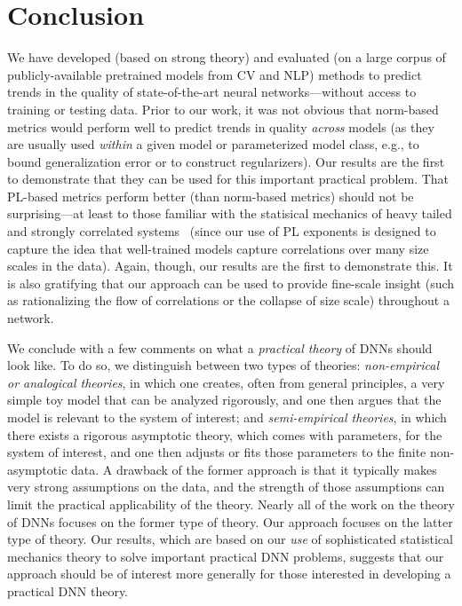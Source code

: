 \section{Conclusion}
\label{sxn:conc}

We have developed (based on strong theory) and evaluated (on a large corpus of publicly-available pretrained models from CV and NLP) methods to predict trends in the quality of state-of-the-art neural networks---without access to training or testing data.
Prior to our work, it was not obvious that norm-based metrics would perform well to predict trends in quality \emph{across} models (as they are usually used \emph{within} a given model or parameterized model class, e.g., to bound generalization error or to construct regularizers).
Our results are the first to demonstrate that they can be used for this important practical problem.
That PL-based metrics perform better (than norm-based metrics) should not be surprising---at least to those familiar with the statisical mechanics of heavy tailed and strongly correlated systems~\cite{BouchaudPotters03, SornetteBook, BP11, bun2017} (since our use of PL exponents is designed to capture the idea that well-trained models capture correlations over many size scales in the data).
Again, though, our results are the first to demonstrate this.
It is also gratifying that our approach can be used to provide fine-scale insight (such as rationalizing the flow of correlations or the collapse of size scale) throughout a network. 

We conclude with a few comments on what a \emph{practical theory} of DNNs should look like.
To do so, we distinguish between two types of theories:
\emph{non-empirical or analogical theories}, in which one creates, often from general principles, a very simple toy model that can be analyzed rigorously, and one then argues that the model is relevant to the system of interest; and 
\emph{semi-empirical theories}, in which there exists a rigorous asymptotic theory, which comes with parameters, for the system of interest, and one then adjusts or fits those parameters to the finite non-asymptotic data.
A drawback of the former approach is that it typically makes very strong assumptions on the data, and the strength of those assumptions can limit the practical applicability of the theory.
Nearly all of the work on the theory of DNNs focuses on the former type of theory.
Our approach focuses on the latter type of theory.
Our results, which are based on our \emph{use} of sophisticated statistical mechanics theory to solve important practical DNN problems, suggests that our approach should be of interest more generally for those interested in developing a practical DNN theory.


